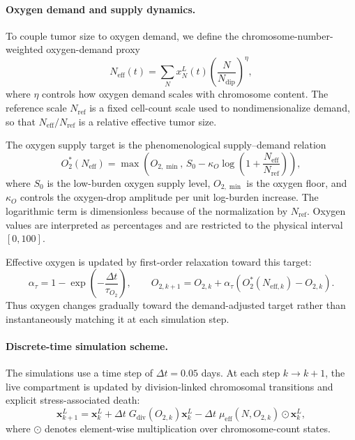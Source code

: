 \documentclass[11pt]{article}
\begin{document}
\paragraph{Oxygen demand and supply dynamics.}

To couple tumor size to oxygen demand, we define the chromosome-number-weighted oxygen-demand proxy
\begin{equation}
N_{\mathrm{eff}}(t)=\sum_N x_N^L(t)\left(\frac{N}{N_{\mathrm{dip}}}\right)^{\eta},
\label{eq:appendix_o2_neff}
\end{equation}
where $\eta$ controls how oxygen demand scales with chromosome content. The reference scale $N_{\mathrm{ref}}$ is a fixed cell-count scale used to nondimensionalize demand, so that $N_{\mathrm{eff}}/N_{\mathrm{ref}}$ is a relative effective tumor size.

The oxygen supply target is the phenomenological supply--demand relation
\begin{equation}
O_2^\ast(N_{\mathrm{eff}})
=
\max\!\left(
O_{2,\min},
\,
S_0
-
\kappa_O \log\!\left(
1+\frac{N_{\mathrm{eff}}}{N_{\mathrm{ref}}}
\right)
\right),
\label{eq:appendix_o2_target}
\end{equation}
where $S_0$ is the low-burden oxygen supply level, $O_{2,\min}$ is the oxygen floor, and $\kappa_O$ controls the oxygen-drop amplitude per unit log-burden increase. The logarithmic term is dimensionless because of the normalization by $N_{\mathrm{ref}}$. Oxygen values are interpreted as percentages and are restricted to the physical interval $[0,100]$.

Effective oxygen is updated by first-order relaxation toward this target:
\begin{equation}
\alpha_{\tau}=1-\exp\!\left(-\frac{\Delta t}{\tau_{O_2}}\right),
\qquad
O_{2,k+1}=O_{2,k}+\alpha_{\tau}\!\left(O_2^\ast(N_{\mathrm{eff},k})-O_{2,k}\right).
\label{eq:o2_relax}
\end{equation}
Thus oxygen changes gradually toward the demand-adjusted target rather than instantaneously matching it at each simulation step.

\paragraph{Discrete-time simulation scheme.}

The simulations use a time step of $\Delta t=0.05$ days. At each step $k\to k+1$, the live compartment is updated by division-linked chromosomal transitions and explicit stress-associated death:
\begin{equation}
\mathbf{x}^{L}_{k+1}
=
\mathbf{x}^{L}_{k}
+
\Delta t\;G_{\mathrm{div}}(O_{2,k})\mathbf{x}^{L}_{k}
-
\Delta t\;\mu_{\mathrm{eff}}(N,O_{2,k})\odot\mathbf{x}^{L}_{k},
\label{eq:appendix_viable_ode}
\end{equation}
where $\odot$ denotes element-wise multiplication over chromosome-count states.
\end{document}
